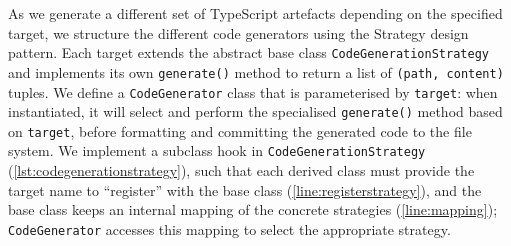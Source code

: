 As we generate a different set of TypeScript artefacts depending
on the specified target, we structure the different code generators
using the Strategy design pattern. Each target extends the
abstract base class \texttt{CodeGenerationStrategy} 
and implements its own \texttt{generate()}
method to return a list of \texttt{(path, content)} tuples. 
We define a \texttt{CodeGenerator} class that is parameterised 
by \texttt{target}: when instantiated, it will select and perform 
the specialised \texttt{generate()} method based on \texttt{target}, 
before formatting and committing the generated code 
to the file system.
We implement a subclass hook in \texttt{CodeGenerationStrategy}
(\cref{lst:codegenerationstrategy}),
such that each derived class must provide the target name to
``register'' with the base class (\cref{line:registerstrategy}),
and the base class keeps an internal
mapping of the concrete strategies (\cref{line:mapping}); 
\texttt{CodeGenerator} accesses
this mapping to select the appropriate strategy.
